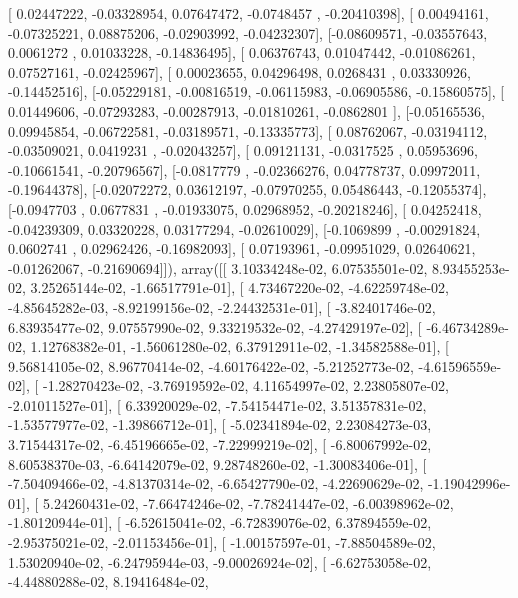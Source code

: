 \documentclass{article}
\begin{document}
       [ 0.02447222, -0.03328954,  0.07647472, -0.0748457 , -0.20410398],
       [ 0.00494161, -0.07325221,  0.08875206, -0.02903992, -0.04232307],
       [-0.08609571, -0.03557643,  0.0061272 ,  0.01033228, -0.14836495],
       [ 0.06376743,  0.01047442, -0.01086261,  0.07527161, -0.02425967],
       [ 0.00023655,  0.04296498,  0.0268431 ,  0.03330926, -0.14452516],
       [-0.05229181, -0.00816519, -0.06115983, -0.06905586, -0.15860575],
       [ 0.01449606, -0.07293283, -0.00287913, -0.01810261, -0.0862801 ],
       [-0.05165536,  0.09945854, -0.06722581, -0.03189571, -0.13335773],
       [ 0.08762067, -0.03194112, -0.03509021,  0.0419231 , -0.02043257],
       [ 0.09121131, -0.0317525 ,  0.05953696, -0.10661541, -0.20796567],
       [-0.0817779 , -0.02366276,  0.04778737,  0.09972011, -0.19644378],
       [-0.02072272,  0.03612197, -0.07970255,  0.05486443, -0.12055374],
       [-0.0947703 ,  0.0677831 , -0.01933075,  0.02968952, -0.20218246],
       [ 0.04252418, -0.04239309,  0.03320228,  0.03177294, -0.02610029],
       [-0.1069899 , -0.00291824,  0.0602741 ,  0.02962426, -0.16982093],
       [ 0.07193961, -0.09951029,  0.02640621, -0.01262067, -0.21690694]]), array([[  3.10334248e-02,   6.07535501e-02,   8.93455253e-02,
          3.25265144e-02,  -1.66517791e-01],
       [  4.73467220e-02,  -4.62259748e-02,  -4.85645282e-03,
         -8.92199156e-02,  -2.24432531e-01],
       [ -3.82401746e-02,   6.83935477e-02,   9.07557990e-02,
          9.33219532e-02,  -4.27429197e-02],
       [ -6.46734289e-02,   1.12768382e-01,  -1.56061280e-02,
          6.37912911e-02,  -1.34582588e-01],
       [  9.56814105e-02,   8.96770414e-02,  -4.60176422e-02,
         -5.21252773e-02,  -4.61596559e-02],
       [ -1.28270423e-02,  -3.76919592e-02,   4.11654997e-02,
          2.23805807e-02,  -2.01011527e-01],
       [  6.33920029e-02,  -7.54154471e-02,   3.51357831e-02,
         -1.53577977e-02,  -1.39866712e-01],
       [ -5.02341894e-02,   2.23084273e-03,   3.71544317e-02,
         -6.45196665e-02,  -7.22999219e-02],
       [ -6.80067992e-02,   8.60538370e-03,  -6.64142079e-02,
          9.28748260e-02,  -1.30083406e-01],
       [ -7.50409466e-02,  -4.81370314e-02,  -6.65427790e-02,
         -4.22690629e-02,  -1.19042996e-01],
       [  5.24260431e-02,  -7.66474246e-02,  -7.78241447e-02,
         -6.00398962e-02,  -1.80120944e-01],
       [ -6.52615041e-02,  -6.72839076e-02,   6.37894559e-02,
         -2.95375021e-02,  -2.01153456e-01],
       [ -1.00157597e-01,  -7.88504589e-02,   1.53020940e-02,
         -6.24795944e-03,  -9.00026924e-02],
       [ -6.62753058e-02,  -4.44880288e-02,   8.19416484e-02,
\end{document}
